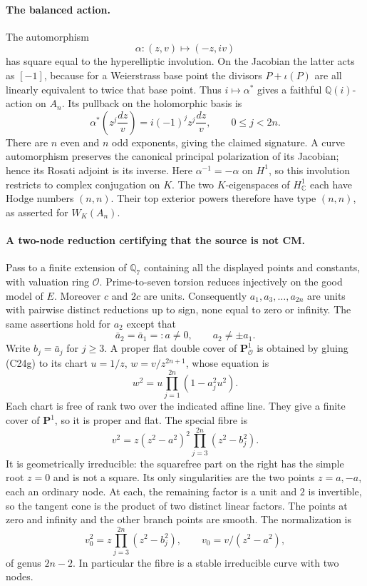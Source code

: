 \documentclass[11pt]{article}
\newcommand{\Q}{\mathbb Q}\newcommand{\C}{\mathbb C}\newcommand{\Z}{\mathbb Z}\newcommand{\R}{\mathbb R}\newcommand{\A}{\mathbb A}\newcommand{\OO}{\mathcal O}
\theoremstyle{definition}\newtheorem{definition}[theorem]{Definition}\newtheorem{remark}[theorem]{Remark}
\begin{document}
\paragraph{The balanced action.}
The automorphism
\[
 \alpha:(z,v)\longmapsto(-z,iv)
\]
has square equal to the hyperelliptic involution. On the
Jacobian the latter acts as $[-1]$, because for a Weierstrass
base point the divisors $P+\iota(P)$ are all linearly equivalent
to twice that base point. Thus $i\mapsto\alpha^*$ gives
a faithful $\Q(i)$-action on $A_n$. Its pullback on the
holomorphic basis is
\[
 \alpha^*\left(z^j\frac{dz}{v}\right)
   =i(-1)^j z^j\frac{dz}{v},\qquad 0\leq j<2n.
\]
There are $n$ even and $n$ odd exponents, giving the claimed
signature. A curve automorphism preserves the canonical
principal polarization of its Jacobian; hence its Rosati
adjoint is its inverse. Here $\alpha^{-1}=-\alpha$ on
$H^1$, so this involution restricts to complex conjugation
on $K$. The two $K$-eigenspaces of $H^1_\C$ each have
Hodge numbers $(n,n)$. Their top exterior powers therefore
have type $(n,n)$, as asserted for $W_K(A_n)$.

\paragraph{A two-node reduction certifying that the source is not CM.}
Pass to a finite extension of $\Q_7$ containing all the
displayed points and constants, with valuation ring $\mathcal O$.
Prime-to-seven torsion reduces injectively on the good model
of $E$. Moreover $c$ and $2c$ are units. Consequently
$a_1,a_3,\ldots,a_{2n}$ are units with pairwise distinct
reductions up to sign, none equal to zero or infinity.
The same assertions hold for $a_2$ except that
\[
 \bar a_2=\bar a_1=:a\ne0,\qquad a_2\ne\pm a_1.
\]
Write $b_j=\bar a_j$ for $j\geq3$. A proper flat double
cover of $\mathbf P^1_{\mathcal O}$ is obtained by gluing
(C24g) to its chart $u=1/z$, $w=v/z^{2n+1}$, whose equation is
\[
 w^2=u\prod_{j=1}^{2n}(1-a_j^2u^2).
\]
Each chart is free of rank two over the indicated affine
line. They give a finite cover of $\mathbf P^1$, so it is
proper and flat. The special fibre is
\[
 v^2=z(z^2-a^2)^2\prod_{j=3}^{2n}(z^2-b_j^2).
 \tag{C24h}
\]
It is geometrically irreducible: the squarefree part on the
right has the simple root $z=0$ and is not a square.
Its only singularities are the two points $z=a,-a$, each
an ordinary node. At each, the remaining factor is a unit
and $2$ is invertible, so the tangent cone is the product
of two distinct linear factors. The points at zero and
infinity and the other branch points are smooth.
The normalization is
\[
 v_0^2=z\prod_{j=3}^{2n}(z^2-b_j^2),
 \qquad v_0=v/(z^2-a^2),
\]
of genus $2n-2$. In particular the fibre is a stable
irreducible curve with two nodes.
\end{document}
